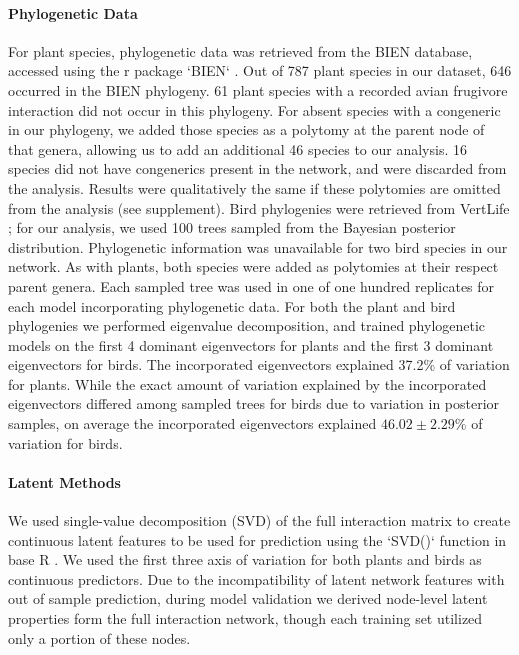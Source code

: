 \documentclass[num-refs]{wiley-article}%
\begin{document}
\paragraph{Phylogenetic Data}
For plant species, phylogenetic data was retrieved from the BIEN database, accessed using the r package `BIEN` \cite{maitner2018bien}. Out of 787 plant species in our dataset, 646 occurred in the BIEN phylogeny. 61 plant species with a recorded avian frugivore interaction did not occur in this phylogeny. For absent species with a congeneric in our phylogeny, we added those species as a polytomy at the parent node of that genera, allowing us to add an additional 46 species to our analysis. 16 species did not have congenerics present in the network, and were discarded from the analysis. Results were qualitatively the same if these polytomies are omitted from the analysis (see supplement). Bird phylogenies were retrieved from VertLife \cite{jetz2012}; for our analysis, we used 100 trees sampled from the Bayesian posterior distribution. Phylogenetic information was unavailable for two bird species in our network. As with plants, both species were added as polytomies at their respect parent genera. Each sampled tree was used in one of one hundred replicates for each model incorporating phylogenetic data. For both the plant and bird phylogenies we performed eigenvalue decomposition, and trained phylogenetic models on the first 4 dominant eigenvectors for plants and the first 3 dominant eigenvectors for birds. The incorporated eigenvectors explained 37.2\% of variation for plants. While the exact amount of variation explained by the incorporated eigenvectors differed among sampled trees for birds due to variation in posterior samples, on average the incorporated eigenvectors explained $46.02\pm 2.29\%$ of variation for birds. 


\paragraph{Latent Methods} We used single-value decomposition (SVD) of the full interaction matrix to create continuous latent features to be used for prediction using the `SVD()` function in base R \cite{RCore}. We used the first three axis of variation for both plants and birds as continuous predictors. Due to the incompatibility of latent network features with out of sample prediction, during model validation we derived node-level latent properties form the full interaction network, though each training set utilized only a portion of these nodes. 
\end{document}
